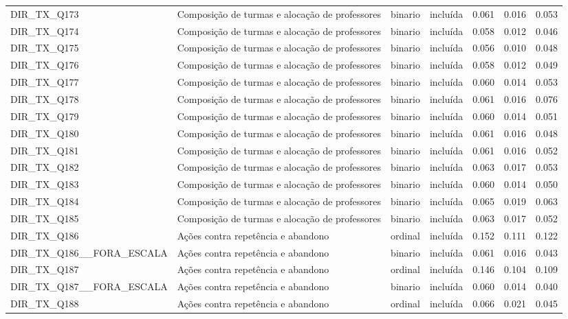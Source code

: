 \begin{tabular}{llllrrr}
DIR\_TX\_Q173 & Composição de turmas e alocação de professores & binario & incluída & 0.061 & 0.016 & 0.053 \\
DIR\_TX\_Q174 & Composição de turmas e alocação de professores & binario & incluída & 0.058 & 0.012 & 0.046 \\
DIR\_TX\_Q175 & Composição de turmas e alocação de professores & binario & incluída & 0.056 & 0.010 & 0.048 \\
DIR\_TX\_Q176 & Composição de turmas e alocação de professores & binario & incluída & 0.058 & 0.012 & 0.049 \\
DIR\_TX\_Q177 & Composição de turmas e alocação de professores & binario & incluída & 0.060 & 0.014 & 0.053 \\
DIR\_TX\_Q178 & Composição de turmas e alocação de professores & binario & incluída & 0.061 & 0.016 & 0.076 \\
DIR\_TX\_Q179 & Composição de turmas e alocação de professores & binario & incluída & 0.060 & 0.014 & 0.051 \\
DIR\_TX\_Q180 & Composição de turmas e alocação de professores & binario & incluída & 0.061 & 0.016 & 0.048 \\
DIR\_TX\_Q181 & Composição de turmas e alocação de professores & binario & incluída & 0.061 & 0.016 & 0.052 \\
DIR\_TX\_Q182 & Composição de turmas e alocação de professores & binario & incluída & 0.063 & 0.017 & 0.053 \\
DIR\_TX\_Q183 & Composição de turmas e alocação de professores & binario & incluída & 0.060 & 0.014 & 0.050 \\
DIR\_TX\_Q184 & Composição de turmas e alocação de professores & binario & incluída & 0.065 & 0.019 & 0.063 \\
DIR\_TX\_Q185 & Composição de turmas e alocação de professores & binario & incluída & 0.063 & 0.017 & 0.052 \\
DIR\_TX\_Q186 & Ações contra repetência e abandono & ordinal & incluída & 0.152 & 0.111 & 0.122 \\
DIR\_TX\_Q186\_\_FORA\_ESCALA & Ações contra repetência e abandono & binario & incluída & 0.061 & 0.016 & 0.043 \\
DIR\_TX\_Q187 & Ações contra repetência e abandono & ordinal & incluída & 0.146 & 0.104 & 0.109 \\
DIR\_TX\_Q187\_\_FORA\_ESCALA & Ações contra repetência e abandono & binario & incluída & 0.060 & 0.014 & 0.040 \\
DIR\_TX\_Q188 & Ações contra repetência e abandono & ordinal & incluída & 0.066 & 0.021 & 0.045 \\

\end{tabular}
